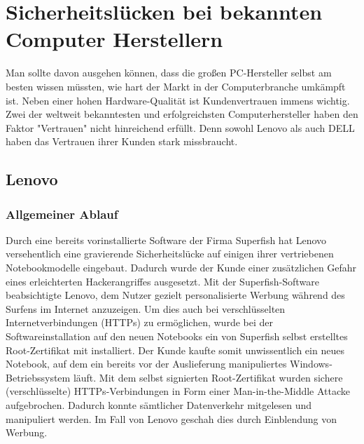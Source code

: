 \section{Sicherheitslücken bei bekannten Computer Herstellern}
Man sollte davon ausgehen können, dass die großen PC-Hersteller selbst am besten wissen müssten, wie hart der Markt in der Computerbranche umkämpft ist. Neben einer hohen Hardware-Qualität ist Kundenvertrauen immens wichtig. Zwei der weltweit bekanntesten und erfolgreichsten Computerhersteller \cite[vgl.]{pc_hersteller} haben den Faktor "Vertrauen" nicht hinreichend erfüllt. Denn sowohl Lenovo als auch DELL haben das Vertrauen ihrer Kunden stark missbraucht. 

\subsection{Lenovo}
\subsubsection{Allgemeiner Ablauf}
Durch eine bereits vorinstallierte Software der Firma Superfish hat Lenovo versehentlich eine gravierende Sicherheitslücke auf einigen ihrer vertriebenen Notebookmodelle eingebaut. Dadurch wurde der Kunde einer zusätzlichen Gefahr eines erleichterten Hackerangriffes ausgesetzt.
Mit der Superfish-Software beabsichtigte Lenovo, dem Nutzer gezielt personalisierte Werbung während des Surfens im Internet anzuzeigen. Um dies auch bei verschlüsselten Internetverbindungen (HTTPs) zu ermöglichen, wurde bei der Softwareinstallation auf den neuen Notebooks ein von Superfish selbst erstelltes Root-Zertifikat mit installiert. Der Kunde kaufte somit unwissentlich ein neues Notebook, auf dem ein bereits vor der Auslieferung manipuliertes Windows-Betriebssystem läuft. 
Mit dem selbst signierten Root-Zertifikat wurden sichere (verschlüsselte) HTTPs-Verbindungen in Form einer Man-in-the-Middle Attacke aufgebrochen. Dadurch konnte sämtlicher Datenverkehr mitgelesen und  manipuliert werden. Im Fall von Lenovo geschah dies durch Einblendung von Werbung. 

